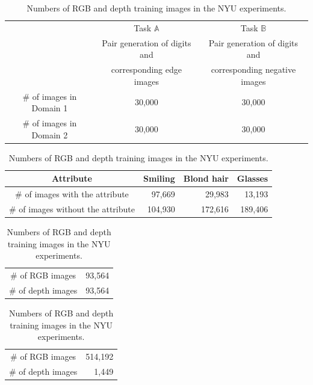 \begin{table}[tbh!]
\centering
{ 
\caption{Numbers of training images in Domain 1 and Domain 2 in the MNIST experiments.}
\label{tbl::dataset_digit_count}
\begin{tabular}{ccc}
\hline
 & Task $\mathbb{A}$ 						 & Task $\mathbb{B}$ \\
 & Pair generation of digits and & Pair generation of digits and \\
 & corresponding edge images     & corresponding negative images\\ 
\hline
\# of images in Domain 1 & 30,000 & 30,000 \\
\# of images in Domain 2 & 30,000 & 30,000 \\
\hline
\end{tabular}}
\centering
{ 
\vspace{4mm}
\caption{Numbers of training images of different attributes in the pair face generation experiments.}
\label{tbl::dataset_attr_count}
\begin{tabular}{crrr}
\hline
Attribute & Smiling & Blond hair & Glasses\\
\hline
\# of images with the attribute & 97,669 & 29,983 & 13,193\\
\# of images without the attribute & 104,930  & 172,616 & 189,406\\
\hline
\end{tabular}}
\centering
{ 
\vspace{4mm}
\caption{Numbers of RGB and depth training images in the RGBD experiments.}
\label{tbl::dataset_rgbd_count}
\begin{tabular}{cc}
\hline
\# of RGB images   & 93,564 \\
\# of depth images & 93,564 \\
\hline
\end{tabular}}
\centering
{ 
\vspace{4mm}
\caption{Numbers of RGB and depth training images in the NYU experiments.}
\label{tbl::dataset_nyu_count}
\begin{tabular}{cr}
\hline
\# of RGB images   & 514,192 \\
\# of depth images & 1,449 \\
\hline
\end{tabular}}
\end{table}
